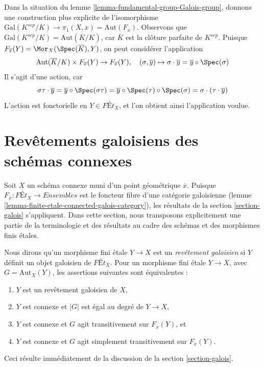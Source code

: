 \begin{remark}
\label{remark-variance}
Dans la situation du lemme \ref{lemma-fundamental-group-Galois-group},
donnons une construction plus explicite de l'isomorphisme
$\text{Gal}(K^{sep}/K) \to
\pi_1(X, \overline{x}) = \text{Aut}(F_{\overline{x}})$.
Observons que
$\text{Gal}(K^{sep}/K) = \text{Aut}(\overline{K}/K)$,
car $\overline{K}$ est la clôture parfaite de $K^{sep}$.
Puisque $F_{\overline{x}}(Y) = \Mor_X(\Spec(\overline{K}), Y)$,
on peut considérer l'application
$$
\text{Aut}(\overline{K}/K) \times F_{\overline{x}}(Y) \to F_{\overline{x}}(Y),
\quad
(\sigma, \overline{y}) \mapsto
\sigma \cdot \overline{y} = \overline{y} \circ \Spec(\sigma)
$$
Il s'agit d'une action, car
$$
\sigma\tau \cdot \overline{y} =
\overline{y} \circ \Spec(\sigma\tau) =
\overline{y} \circ \Spec(\tau) \circ \Spec(\sigma) =
\sigma \cdot (\tau \cdot \overline{y})
$$
L'action est fonctorielle en $Y \in \textit{F\'Et}_X$, et l'on
obtient ainsi l'application voulue.
\end{remark}





\section{Revêtements galoisiens des schémas connexes}
\label{section-finite-etale-under-galois}

\noindent
Soit $X$ un schéma connexe muni d'un point géométrique $\overline{x}$.
Puisque $F_{\overline{x}} : \textit{F\'Et}_X \to \textit{Ensembles}$ est le foncteur fibre d'une
catégorie galoisienne (lemme \ref{lemma-finite-etale-connected-galois-category}),
les résultats de la section \ref{section-galois} s'appliquent.
Dans cette section, nous transposons explicitement une partie de la terminologie
et des résultats au cadre des schémas et des morphismes finis étales.

\medskip\noindent
Nous dirons qu'un morphisme fini étale $Y \to X$ est un
{\it revêtement galoisien} si $Y$ définit un objet galoisien de
$\textit{F\'Et}_X$.
Pour un morphisme fini étale $Y \to X$, avec $G = \text{Aut}_X(Y)$,
les assertions suivantes sont équivalentes :
\begin{enumerate}
\item $Y$ est un revêtement galoisien de $X$,
\item $Y$ est connexe et $|G|$ est égal au degré de $Y \to X$,
\item $Y$ est connexe et $G$ agit transitivement sur $F_{\overline{x}}(Y)$, et
\item $Y$ est connexe et $G$ agit simplement transitivement sur
$F_{\overline{x}}(Y)$.
\end{enumerate}
Ceci résulte immédiatement de la discussion de la section \ref{section-galois}.

